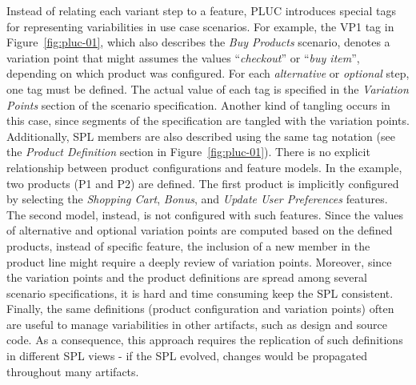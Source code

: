 Instead of relating each variant step to a feature, PLUC introduces special tags for representing 
variabilities in use case scenarios. For example, the VP1 tag in Figure~\ref{fig:pluc-01}, which also 
describes the \emph{Buy Products} scenario, denotes a variation point that might assumes the 
values ``\emph{checkout}'' or ``\emph{buy item}'', depending on which product was configured. For 
each \emph{alternative} or \emph{optional} step, one tag must be defined. The actual value
of each tag is specified in the \emph{Variation Points} section of the scenario specification. Another kind 
of tangling occurs in this case, since segments of the specification are tangled with the variation 
points. Additionally, SPL members are also described using the same tag notation (see the \emph{Product Definition} section 
in Figure~\ref{fig:pluc-01}). There is no explicit relationship between product configurations and feature models. In the example, 
two products (P1 and P2) are defined. The first product is implicitly configured by selecting the \emph{Shopping Cart}, 
\emph{Bonus}, and \emph{Update User Preferences} features. The second model, instead, is not configured 
with such features. Since the values of alternative and optional variation points are computed based on the defined products, instead 
of specific feature, the inclusion of a new member in the product line might require a deeply review of 
variation points. Moreover, since the variation points and the product definitions are spread among several scenario specifications, it is 
hard and time consuming keep the SPL consistent. Finally, the same definitions (product configuration and variation points) often are 
useful to manage variabilities in other artifacts, such as design and source code. As a consequence, this approach requires the replication of such 
definitions in different SPL views - if the SPL evolved, changes would be propagated throughout many artifacts.

